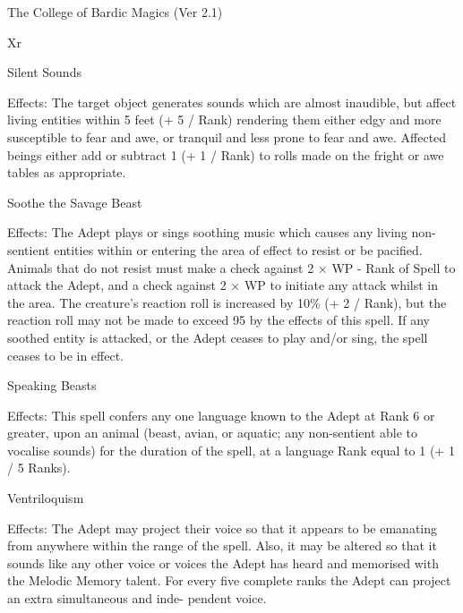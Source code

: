 \begin{Chapter}{The College of Bardic Magics (Ver 2.1)}
\begin{tarularx}{\columnwidth}{Xr}
\begin{spell}[G-8]{Silent Sounds }

Effects:  The  target  object  generates  sounds  which 
are  almost  inaudible,  but  affect  living  entities 
within  5  feet  (+  5  /  Rank)  rendering  them  either 
edgy  and  more  susceptible  to  fear  and  awe,  or 
tranquil  and  less  prone  to  fear  and  awe.  Affected 
beings either add or subtract 1 (+ 1 / Rank) to rolls 
made on the fright or awe tables as appropriate. 
\end{spell}

\begin{spell}[G-9]{Soothe the Savage Beast }

Effects:  The  Adept  plays  or  sings  soothing  music 
which  causes  any  living  non-sentient  entities 
within or entering the area of  effect to resist or be 
pacified.  Animals  that  do  not  resist  must  make  a 
check against 2 × WP - Rank of Spell to attack the 
Adept, and a check against 2 × WP to initiate any 
attack  whilst  in  the  area.  The  creature’s  reaction 
roll is increased by 10\% (+ 2 / Rank), but the reaction  roll  may  not  be  made  to  exceed  95  by  the 
effects  of  this  spell.  If  any  soothed  entity  is  attacked, or the Adept ceases to play and/or sing, the 
spell ceases to be in effect. 
\end{spell}

\begin{spell}[G-10]{Speaking Beasts }

Effects: This spell confers any one language known 
to the Adept at Rank 6 or greater, upon an animal 
(beast,  avian,  or  aquatic;  any  non-sentient  able  to 
vocalise  sounds)  for  the  duration  of  the  spell,  at  a 
language Rank equal to 1 (+ 1 / 5 Ranks). 
\end{spell}

\begin{spell}[G-10]{Ventriloquism }

Effects:  The  Adept  may  project their  voice  so  that 
it  appears  to  be  emanating  from  anywhere  within 
the  range  of  the  spell.  Also,  it  may  be  altered  so 
that  it  sounds  like  any  other  voice  or  voices  the 
Adept  has  heard  and  memorised  with  the  Melodic 
Memory  talent.  For  every  five  complete  ranks  the 
Adept can project an extra simultaneous and inde-
pendent voice. 
\end{spell}



\end{tarularx}
\end{Chapter}
